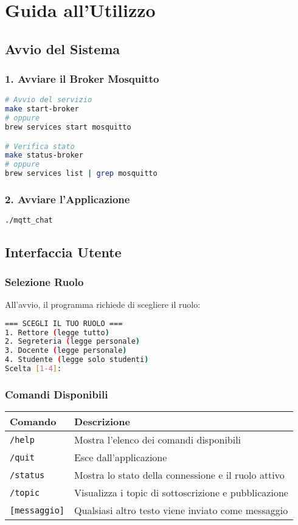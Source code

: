 \documentclass[12pt,a4paper]{article}
\begin{document}
\section{Guida all'Utilizzo}

\subsection{Avvio del Sistema}

\subsubsection{1. Avviare il Broker Mosquitto}
\begin{lstlisting}[language=bash]
# Avvio del servizio
make start-broker
# oppure
brew services start mosquitto

# Verifica stato
make status-broker
# oppure  
brew services list | grep mosquitto
\end{lstlisting}

\subsubsection{2. Avviare l'Applicazione}
\begin{lstlisting}[language=bash]
./mqtt_chat
\end{lstlisting}

\subsection{Interfaccia Utente}

\subsubsection{Selezione Ruolo}
All'avvio, il programma richiede di scegliere il ruolo:

\begin{lstlisting}[language=bash]
=== SCEGLI IL TUO RUOLO ===
1. Rettore (legge tutto)
2. Segreteria (legge personale)  
3. Docente (legge personale)
4. Studente (legge solo studenti)
Scelta [1-4]: 
\end{lstlisting}

\subsubsection{Comandi Disponibili}

\begin{longtable}{|p{3cm}|p{11cm}|}
\hline
\textbf{Comando} & \textbf{Descrizione} \\
\hline
\texttt{/help} & Mostra l'elenco dei comandi disponibili \\
\hline
\texttt{/quit} & Esce dall'applicazione \\
\hline
\texttt{/status} & Mostra lo stato della connessione e il ruolo attivo \\
\hline
\texttt{/topic} & Visualizza i topic di sottoscrizione e pubblicazione \\
\hline
\texttt{[messaggio]} & Qualsiasi altro testo viene inviato come messaggio \\
\hline
\end{longtable}
\end{document}
